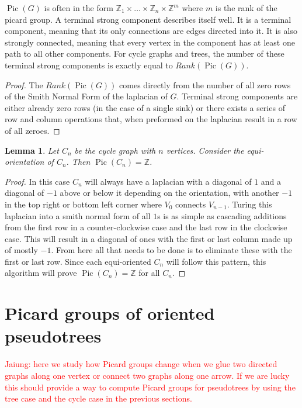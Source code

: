 \documentclass[11pt,reqno]{amsart}
\DeclareMathOperator{\Pic}{Pic}
\theoremstyle{definition}
\theoremstyle{plain}
\newtheorem{lem}[mydef]{Lemma}
\begin{document}
		$\Pic(G)$ is often in the form $\mathbb{Z}_1 \times \dots \times \mathbb{Z}_n \times \mathbb{Z}^m$ where $m$ is
		the rank of the picard group.  A terminal strong component describes itself well.  It is a terminal component,
		meaning that its only connections are edges directed into it.  It is also strongly connected, meaning that every
		vertex in the component has at least one path to all other components.  For cycle graphs and trees, the number
		of these terminal strong components is exactly equal to $Rank(\Pic(G))$.

		\begin{proof}
			The $Rank(\Pic(G))$ comes directly from the number of all zero rows of the Smith Normal Form of the laplacian of
			$G$.  Terminal strong components are either already zero rows (in the case of a single sink) or there
			exists a series of row and column operations that, when preformed on the laplacian result in a row of all
			zeroes.
		\end{proof}

	\begin{lem}
		Let $C_n$ be the cycle graph with $n$ vertices. Consider the equi-orientation of $C_n$.
		Then $\Pic(C_n)=\mathbb{Z}$.
	\end{lem}
	\begin{proof}
		In this case $C_n$ will always have a laplacian with a diagonal of $1$ and a diagonal of $-1$
		above or below it depending on the orientation, with another $-1$ in the top right or bottom left corner
		where $V_0$ connects $V_{n-1}$.  Turing this laplacian into a smith normal form of all $1$s is as simple as
		cascading additions from the first row in a counter-clockwise case and the last row in the clockwise case.
		This will result in a diagonal of ones with the first or last column made up of mostly $-1$.  From here
		all that needs to be done is to eliminate these with the first or last row.  Since each equi-oriented $C_n$
		will follow this pattern, this algorithm will prove $\Pic(C_n)=\mathbb{Z}$ for all $C_n$.
	\end{proof}

\section{Picard groups of oriented pseudotrees}

	\textcolor{red}{Jaiung: here we study how Picard groups change when we glue two directed graphs along one vertex or
		connect two graphs along one arrow. If we are lucky this should provide a way to compute Picard groups for
		pseudotrees by using the tree case and the cycle case in the previous sections.}
\end{document}
